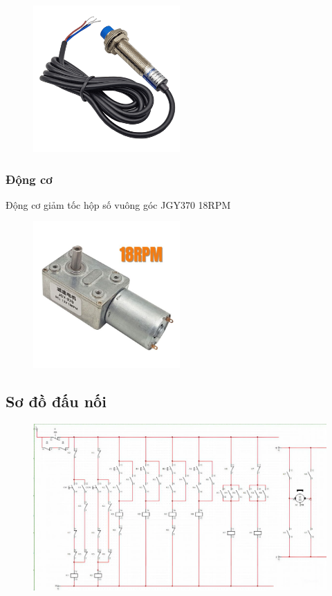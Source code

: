 \begin{figure}[H]
    \centering
    \includegraphics[width=0.5\textwidth]{pictures/Sensor.png}
\end{figure}
\cleardoublepage



\subsubsection{Động cơ}
Động cơ giảm tốc hộp số vuông góc JGY370 18RPM
\begin{figure}[H]
    \centering
    \includegraphics[width=0.5\textwidth]{pictures/motor.png}
\end{figure}
\subsection{Sơ đồ đấu nối}
\begin{figure}[H]
    \centering
    \includegraphics[width=1\textwidth]{pictures/connection.jpg}
\end{figure}
\cleardoublepage